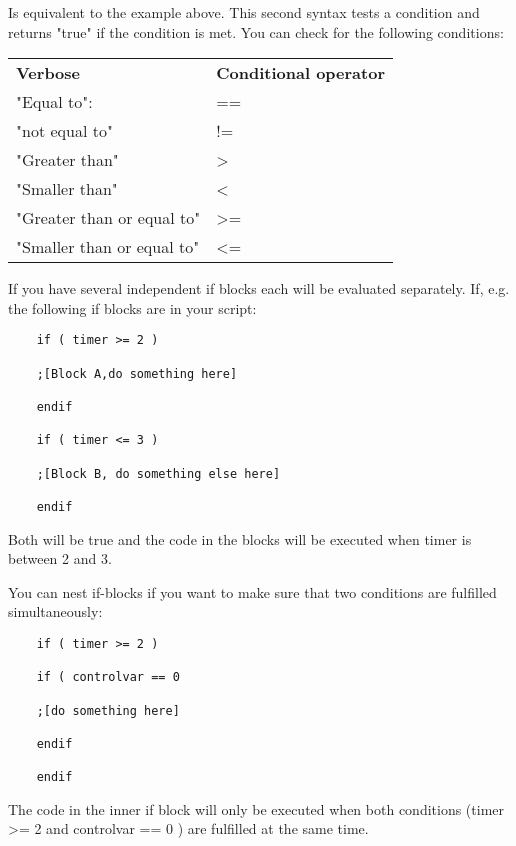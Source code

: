 Is equivalent to the example above. This second syntax tests a condition
and returns "true" if the condition is met. You can check for the
following conditions:


\begin{longtable}[]{@{}
  >{\raggedright\arraybackslash}p{}
  >{\raggedright\arraybackslash}p{}@{}}
\toprule
\endhead
\textbf{Verbose} & \textbf{Conditional operator} \\
"Equal to": & == \\
"not equal to" & != \\
"Greater than" & > \\
"Smaller than" & < \\
"Greater than or equal to" & >= \\
"Smaller than or equal to" & <= \\
\bottomrule
\end{longtable}

If you have several independent if blocks each will be evaluated
separately. If, e.g. the following if blocks are in your script:

\begin{lstlisting}
	if ( timer >= 2 )
	
	;[Block A,do something here]
	
	endif
	
	if ( timer <= 3 )
	
	;[Block B, do something else here]
	
	endif
\end{lstlisting}

Both will be true and the code in the blocks will be executed when timer
is between 2 and 3.

You can nest if-blocks if you want to make sure that two conditions are
fulfilled simultaneously:

\begin{lstlisting}
	if ( timer >= 2 )
	
	if ( controlvar == 0
	
	;[do something here]
	
	endif
	
	endif
\end{lstlisting}

The code in the inner if block will only be executed when both
conditions (timer >= 2 and controlvar == 0 ) are fulfilled at
the same time.

